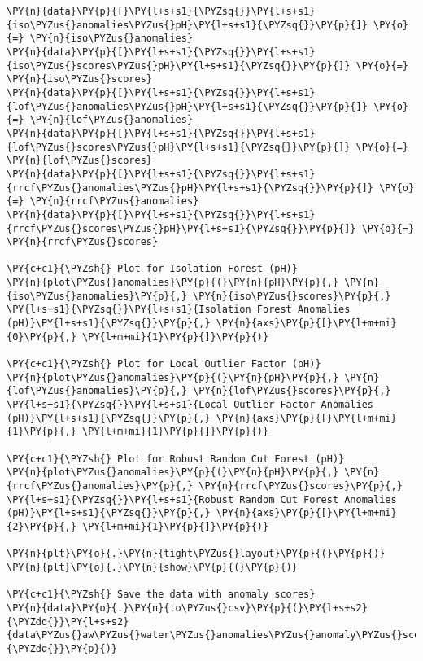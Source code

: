 \begin{tcolorbox}[breakable, size=fbox, boxrule=1pt, pad at break*=1mm,colback=cellbackground, colframe=cellborder]
\begin{Verbatim}[commandchars=\\\{\}]
\PY{n}{data}\PY{p}{[}\PY{l+s+s1}{\PYZsq{}}\PY{l+s+s1}{iso\PYZus{}anomalies\PYZus{}pH}\PY{l+s+s1}{\PYZsq{}}\PY{p}{]} \PY{o}{=} \PY{n}{iso\PYZus{}anomalies}
\PY{n}{data}\PY{p}{[}\PY{l+s+s1}{\PYZsq{}}\PY{l+s+s1}{iso\PYZus{}scores\PYZus{}pH}\PY{l+s+s1}{\PYZsq{}}\PY{p}{]} \PY{o}{=} \PY{n}{iso\PYZus{}scores}
\PY{n}{data}\PY{p}{[}\PY{l+s+s1}{\PYZsq{}}\PY{l+s+s1}{lof\PYZus{}anomalies\PYZus{}pH}\PY{l+s+s1}{\PYZsq{}}\PY{p}{]} \PY{o}{=} \PY{n}{lof\PYZus{}anomalies}
\PY{n}{data}\PY{p}{[}\PY{l+s+s1}{\PYZsq{}}\PY{l+s+s1}{lof\PYZus{}scores\PYZus{}pH}\PY{l+s+s1}{\PYZsq{}}\PY{p}{]} \PY{o}{=} \PY{n}{lof\PYZus{}scores}
\PY{n}{data}\PY{p}{[}\PY{l+s+s1}{\PYZsq{}}\PY{l+s+s1}{rrcf\PYZus{}anomalies\PYZus{}pH}\PY{l+s+s1}{\PYZsq{}}\PY{p}{]} \PY{o}{=} \PY{n}{rrcf\PYZus{}anomalies}
\PY{n}{data}\PY{p}{[}\PY{l+s+s1}{\PYZsq{}}\PY{l+s+s1}{rrcf\PYZus{}scores\PYZus{}pH}\PY{l+s+s1}{\PYZsq{}}\PY{p}{]} \PY{o}{=} \PY{n}{rrcf\PYZus{}scores}

\PY{c+c1}{\PYZsh{} Plot for Isolation Forest (pH)}
\PY{n}{plot\PYZus{}anomalies}\PY{p}{(}\PY{n}{pH}\PY{p}{,} \PY{n}{iso\PYZus{}anomalies}\PY{p}{,} \PY{n}{iso\PYZus{}scores}\PY{p}{,} \PY{l+s+s1}{\PYZsq{}}\PY{l+s+s1}{Isolation Forest Anomalies (pH)}\PY{l+s+s1}{\PYZsq{}}\PY{p}{,} \PY{n}{axs}\PY{p}{[}\PY{l+m+mi}{0}\PY{p}{,} \PY{l+m+mi}{1}\PY{p}{]}\PY{p}{)}

\PY{c+c1}{\PYZsh{} Plot for Local Outlier Factor (pH)}
\PY{n}{plot\PYZus{}anomalies}\PY{p}{(}\PY{n}{pH}\PY{p}{,} \PY{n}{lof\PYZus{}anomalies}\PY{p}{,} \PY{n}{lof\PYZus{}scores}\PY{p}{,} \PY{l+s+s1}{\PYZsq{}}\PY{l+s+s1}{Local Outlier Factor Anomalies (pH)}\PY{l+s+s1}{\PYZsq{}}\PY{p}{,} \PY{n}{axs}\PY{p}{[}\PY{l+m+mi}{1}\PY{p}{,} \PY{l+m+mi}{1}\PY{p}{]}\PY{p}{)}

\PY{c+c1}{\PYZsh{} Plot for Robust Random Cut Forest (pH)}
\PY{n}{plot\PYZus{}anomalies}\PY{p}{(}\PY{n}{pH}\PY{p}{,} \PY{n}{rrcf\PYZus{}anomalies}\PY{p}{,} \PY{n}{rrcf\PYZus{}scores}\PY{p}{,} \PY{l+s+s1}{\PYZsq{}}\PY{l+s+s1}{Robust Random Cut Forest Anomalies (pH)}\PY{l+s+s1}{\PYZsq{}}\PY{p}{,} \PY{n}{axs}\PY{p}{[}\PY{l+m+mi}{2}\PY{p}{,} \PY{l+m+mi}{1}\PY{p}{]}\PY{p}{)}

\PY{n}{plt}\PY{o}{.}\PY{n}{tight\PYZus{}layout}\PY{p}{(}\PY{p}{)}
\PY{n}{plt}\PY{o}{.}\PY{n}{show}\PY{p}{(}\PY{p}{)}

\PY{c+c1}{\PYZsh{} Save the data with anomaly scores}
\PY{n}{data}\PY{o}{.}\PY{n}{to\PYZus{}csv}\PY{p}{(}\PY{l+s+s2}{\PYZdq{}}\PY{l+s+s2}{data\PYZus{}aw\PYZus{}water\PYZus{}anomalies\PYZus{}anomaly\PYZus{}scores.csv}\PY{l+s+s2}{\PYZdq{}}\PY{p}{)}


\end{Verbatim}
\end{tcolorbox}
